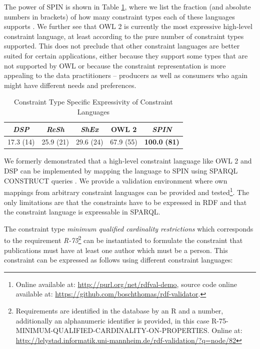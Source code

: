 \documentclass[a4paper,fontsize=11pt]{scrartcl}
\begin{document}
The power of SPIN is shown in 
Table \ref{tab:constraint-type-specific-expressivity}, where we list the fraction (and absolute numbers in brackets) of how many constraint types each of these languages supports \cite{BoschNolleAcarEckert2015}. 
We further see that OWL 2 is currently the most expressive high-level constraint language, at least according to the pure number of constraint types supported. This does not preclude that other constraint languages are better suited for certain applications, either because they support some types that are not supported by OWL or because the constraint representation is more appealing to the data practitioners -- producers as well as consumers who again might have different needs and preferences.

\begin{table}[H]
	\centering
		\caption{Constraint Type Specific Expressivity of Constraint Languages}
	  \scriptsize
		\begin{tabular}{c|c|c|c|c}
			\emph{DSP} & \emph{ReSh} & \emph{ShEx} & OWL 2 & \emph{SPIN} \\	
      \hline
			17.3 (14) & 25.9 (21) & 29.6 (24) & 67.9 (55) & \textbf{100.0} \textbf{(81)} 
		\end{tabular}
	\label{tab:constraint-type-specific-expressivity}
\end{table}

We formerly demonstrated that a high-level constraint language like OWL 2 and DSP can be implemented by mapping the language to SPIN using SPARQL CONSTRUCT queries \cite{BoschEckert2014-2}. We provide a validation environment where own mappings from arbitrary constraint languages can be provided and tested\footnote{Online available at: \url{http://purl.org/net/rdfval-demo}, source code online available at: \url{https://github.com/boschthomas/rdf-validator}.}. The only limitations are that the constraints have to
be expressed in RDF and that the constraint language is expressable in SPARQL.

The constraint type \emph{minimum qualified cardinality restrictions} which corresponds to the requirement \emph{R-75}\footnote{Requirements are identified in the database by an R and a number, additionally an alphanumeric identifier is provided, in this case R-75-MINIMUM-QUALIFIED-CARDINALITY-ON-PROPERTIES. Online at: \url{http://lelystad.informatik.uni-mannheim.de/rdf-validation/?q=node/82}} can be instantiated to formulate the constraint that publications must have at least one author which must be a person. This constraint can be expressed as follows using different constraint languages:
\end{document}
